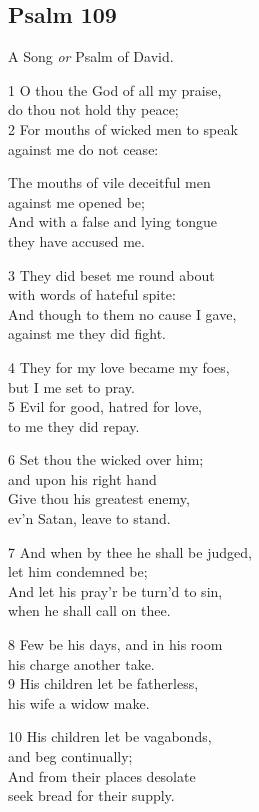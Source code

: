 \subsection*{Psalm 109}


A Song \emph{or} Psalm of David.

1 O thou the God of all my praise,\\
do thou not hold thy peace;\\
2 For mouths of wicked men to speak\\
against me do not cease:

The mouths of vile deceitful men\\
against me opened be;\\
And with a false and lying tongue\\
they have accused me.

3 They did beset me round about\\
with words of hateful spite:\\
And though to them no cause I gave,\\
against me they did fight.

4 They for my love became my foes,\\
but I me set to pray.\\
5 Evil for good, hatred for love,\\
to me they did repay.

6 Set thou the wicked over him;\\
and upon his right hand\\
Give thou his greatest enemy,\\
ev’n Satan, leave to stand.

7 And when by thee he shall be judged,\\
let him condemned be;\\
And let his pray’r be turn’d to sin,\\
when he shall call on thee.

8 Few be his days, and in his room\\
his charge another take.\\
9 His children let be fatherless,\\
his wife a widow make.

10 His children let be vagabonds,\\
and beg continually;\\
And from their places desolate\\
seek bread for their supply.

